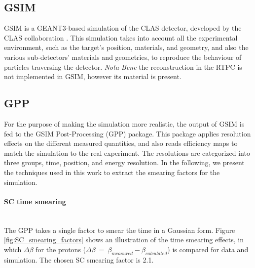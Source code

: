 \subsection{GSIM}
GSIM is a GEANT3-based simulation of the CLAS detector, developed by the CLAS collaboration \cite{GSIM}. This simulation takes into account all the experimental environment, such as the target's position, materials, and geometry, and also the various sub-detectors' materials and geometries, to reproduce the behaviour of particles traversing the detector. {\it Nota Bene} the reconstruction in the RTPC is not implemented in GSIM, however its material is present.

\subsection{GPP}
For the purpose of making the simulation more realistic, the output of GSIM is fed to the GSIM Post-Processing (GPP) package. This package applies resolution effects on the different measured quantities, and also reads efficiency maps to match the simulation to the real experiment. The resolutions are categorized into three groups, time, position, and energy resolution. In the following, we present the techniques used in this work to extract the smearing factors for the simulation.

\paragraph{SC time smearing} ~\\
The GPP takes a single factor to smear the time in a Gaussian form. Figure \ref{fig:SC_smearing_factors} shows an illustration of the time smearing effects, in which $\Delta \beta$ for the protons ($\Delta\beta~=~\beta_{measured}-\beta_{calculated}$) is compared for data and simulation. The chosen SC smearing factor is 2.1.

